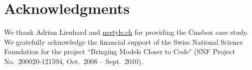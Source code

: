 \documentclass[10pt,twocolumn]{article}
\newcommand{\Slime}{\textsc{Slime}\xspace}
\begin{document}

\section*{Acknowledgments} \balance

We thank Adrian Lienhard and \href{http://www.nestyle.ch}{nestyle.ch} for providing the Cmsbox case study. We gratefully acknowledge the financial support of the Swiss National Science Foundation for the project ``Bringing Models Closer to Code" (SNF Project No.\ 200020-121594, Oct.\ 2008 -- Sept.\ 2010).



\end{document}
